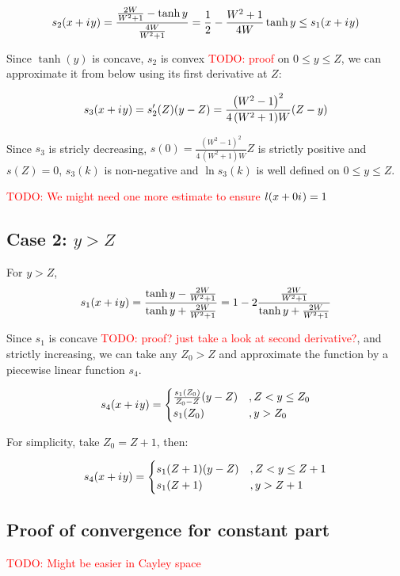 \documentclass[12pt, a4paper]{article}
\newcommand{\iu}{{i\mkern1mu}}
\newcommand{\todo}[1]{{\large \textcolor{red}{TODO: #1}}}
\begin{document}
\[
s_2(x + \iu y) = \frac{\frac{2 W}{W^2 + 1} - \tanh y}{\frac{4 W}{W^2 + 1}} = \frac{1}{2} - \frac{W^2 + 1}{4 W} \tanh y \le s_1(x + \iu y)
\]

Since $\tanh(y)$ is concave, $s_2$ is convex \todo{proof} on $0 \le y \le Z$, we can approximate it from below using its first derivative at $Z$:

\[
s_3(x + \iu y) = s_2'(Z)(y - Z) = \frac{{\left(W^{2} - 1\right)}^{2}}{4 \, {\left(W^{2} + 1\right)} W} (Z - y)
\]

Since $s_3$ is stricly decreasing, $s(0) = \frac{{\left(W^{2} - 1\right)}^{2}}{4 \, {\left(W^{2} + 1\right)} W} Z$ is strictly positive and $s(Z) = 0$, $s_3(k)$ is non-negative and $\ln s_3(k)$ is well defined on $0 \le y \le Z$.

\todo{We might need one more estimate to ensure $l(x + 0 \iu) = 1$}


\subsection*{Case 2: $y > Z$}
For $y > Z$, 
\[
s_1(x + \iu y) 
 = \frac{\tanh y - \frac{2 W}{W^2 + 1}}{\tanh y + \frac{2 W}{W^2 + 1}}
 = 1 - 2 \frac{\frac{2 W}{W^2 + 1}}{\tanh y + \frac{2 W}{W^2 + 1}}
\]

Since $s_1$ is concave \todo{proof? just take a look at second derivative?}, and strictly increasing, we can take any $Z_0 > Z$ and approximate the function by a piecewise linear function $s_4$.

\[
s_4(x + \iu y) = 
\begin{cases}
\frac{s_1(Z_0)}{Z_0 - Z} (y - Z) &, Z < y \le Z_0 \\
s_1(Z_0) &, y > Z_0
\end{cases}
\]

For simplicity, take $Z_0 = Z + 1$, then:

\[
s_4(x + \iu y) = 
\begin{cases}
s_1(Z + 1) (y - Z) &, Z < y \le Z + 1 \\
s_1(Z + 1) &, y > Z + 1
\end{cases}
\]


\subsection*{Proof of convergence for constant part}
\todo{Might be easier in Cayley space}
\end{document}
